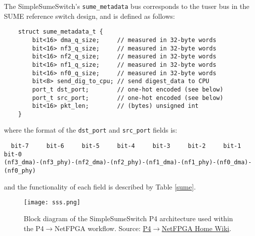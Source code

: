 The SimpleSumeSwitch’s \verb|sume_metadata| bus corresponds to the tuser bus in the SUME reference switch design, and is defined as follows:

{\renewcommand{\baselinestretch}{0.8}\small
	\begin{verbatim}
    struct sume_metadata_t {
        bit<16> dma_q_size;     // measured in 32-byte words
        bit<16> nf3_q_size;     // measured in 32-byte words
        bit<16> nf2_q_size;     // measured in 32-byte words
        bit<16> nf1_q_size;     // measured in 32-byte words
        bit<16> nf0_q_size;     // measured in 32-byte words
        bit<8> send_dig_to_cpu; // send digest_data to CPU
        port_t dst_port;        // one-hot encoded (see below)
        port_t src_port;        // one-hot encoded (see below)
        bit<16> pkt_len;        // (bytes) unsigned int
    }
	\end{verbatim}
}

where the format of the \verb|dst_port| and \verb|src_port| fields is:

{\renewcommand{\baselinestretch}{0.8}\small
\begin{verbatim}
  bit-7     bit-6     bit-5     bit-4     bit-3     bit-2     bit-1     bit-0
(nf3_dma)-(nf3_phy)-(nf2_dma)-(nf2_phy)-(nf1_dma)-(nf1_phy)-(nf0_dma)-(nf0_phy)
\end{verbatim}
}

and the functionality of each field is described by Table \ref{sume}. 

\begin{figure}[!ht]
	\centering
	\texttt{[image: sss.png]}
	\caption{Block diagram of the SimpleSumeSwitch P4 architecture used within the P4$\rightarrow$NetFPGA workflow. Source: \href{https://github.com/NetFPGA/P4-NetFPGA-public/wiki/Workflow-Overview\#simplesumeswitch-architecture}{P4$\rightarrow$NetFPGA Home Wiki}.} 
	\label{sss}
\end{figure}

